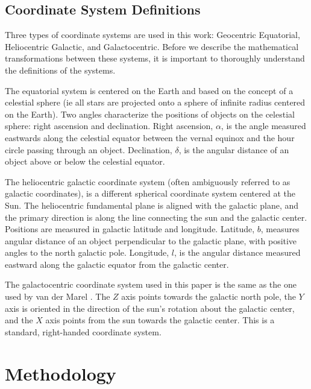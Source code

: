 \documentclass[iop,apj]{emulateapj}
\begin{document}
\subsection{Coordinate System Definitions}
\label{sec:c_sys_defs}
Three types of coordinate systems are used in this work: Geocentric Equatorial, Heliocentric Galactic, and Galactocentric.  Before we describe the mathematical transformations between these systems, it is important to thoroughly understand the definitions of the systems. 
\par The equatorial system is centered on the Earth and based on the concept of a celestial sphere (ie all stars are projected onto a sphere of infinite radius centered on the Earth). Two angles characterize the positions of objects on the celestial sphere: right ascension and declination. Right ascension, $\alpha$, is the angle measured eastwards along the celestial equator between the vernal equinox and the hour circle passing through an object.  Declination, $\delta$, is the angular distance of an object above or below the celestial equator.  
\par The heliocentric galactic coordinate system (often ambiguously referred to as galactic coordinates), is a different spherical coordinate system centered at the Sun.  The heliocentric fundamental plane is aligned with the galactic plane, and the primary direction is along the line connecting the sun and the galactic center.  Positions are measured in galactic latitude and longitude. Latitude, $b$, measures angular distance of an object perpendicular to the galactic plane, with positive angles to the north galactic pole. Longitude, $l$, is the angular distance measured eastward along the galactic equator from the galactic center.
\par The galactocentric coordinate system used in this paper is the same as the one used by van der Marel \citep{VdM08}.  The $Z$ axis points towards the galactic north pole, the $Y$ axis is oriented in the direction of the sun's rotation about the galactic center, and the $X$ axis points from the sun towards the galactic center. This is a standard, right-handed coordinate system.


\section{Methodology}
\label{sec:method}
\end{document}
